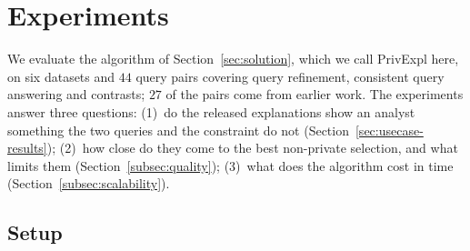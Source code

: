 \section{Experiments}
\label{sec:experiments}

We evaluate the algorithm of Section~\ref{sec:solution}, which we call \textsf{PrivExpl} here, on six datasets and $44$ query pairs covering query refinement, consistent query answering and contrasts; $27$ of the pairs come from earlier work.
The experiments answer three questions:
(1)~do the released explanations show an analyst something the two queries and the constraint do not (Section~\ref{sec:usecase-results});
(2)~how close do they come to the best non-private selection, and what limits them (Section~\ref{subsec:quality});
(3)~what does the algorithm cost in time (Section~\ref{subsec:scalability}).

\subsection{Setup}
\label{subsec:experimental-setup}

\begin{table}[t]
\centering
\small
\caption{Datasets and the source of their query pairs. On IPUMS-CPS $|\mathcal{P}|$ depends on the attribute each question removes.}
\label{tab:datasets}
\setlength{\tabcolsep}{3pt}
\end{table}

